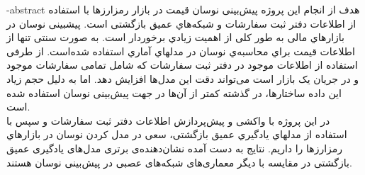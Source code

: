 
\fa-abstract{
	هدف از انجام این پروژه پیش‌بینی نوسان قیمت در بازار رمزارزها با استفاده از اطلاعات دفتر ثبت سفارشات و شبکه‌هاي عمیق بازگشتی است. پیشبینی نوسان در بازارهاي مالی به طور کلی از اهمیت زیادي برخوردار است. به صورت سنتی تنها از اطلاعات قیمت براي محاسبه‌ي نوسان در مدلهاي آماري استفاده شده‌است. از طرفی استفاده از اطلاعات موجود در دفتر ثبت سفارشات که شامل تمامی سفارشات موجود و در جریان یک بازار است می‌تواند دقت این مدل‌ها افزایش دهد. اما به دلیل حجم زیاد این داده ساختارها،‌ در گذشته کمتر از آن‌ها در جهت پیش‌بینی نوسان استفاده شده است.\\
	در این پروژه با واکشی و پیش‌پردازش اطلاعات دفتر ثبت سفارشات و سپس با استفاده از مدلهاي یادگیري عمیق بازگشتی، سعی در مدل کردن نوسان در بازارهاي رمزارزها را داریم. نتایج به دست آمده نشان‌دهنده‌ی برتری مدل‌های یادگیری عمیق بازگشتی در مقایسه با دیگر معماری‌های شبکه‌های عصبی در پیش‌بینی نوسان هستند.
}





\AUTtitle
\vspace*{7cm}
\thispagestyle{empty}
\begin{center}
\end{center}
